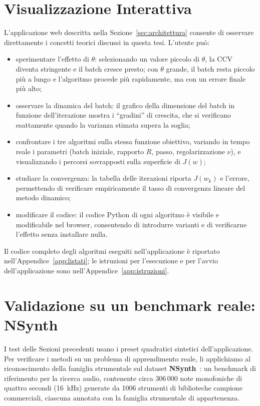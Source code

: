 \documentclass[italian, a4paper, twoside, binding=6mm]{sapthesis}
\begin{document}
\section{Visualizzazione Interattiva}\label{sec:visualizzazione}

L'applicazione web descritta nella Sezione~\ref{sec:architettura} consente
di osservare direttamente i concetti teorici discussi in questa tesi.
L'utente può:

\begin{itemize}
  \item sperimentare l'effetto di $\theta$: selezionando un valore
  piccolo di $\theta$, la CCV diventa stringente e il batch cresce presto; con
  $\theta$ grande, il batch resta piccolo più a lungo e l'algoritmo procede
  più rapidamente, ma con un errore finale più alto;
  \item osservare la dinamica del batch: il grafico della dimensione
  del batch in funzione dell'iterazione mostra i ``gradini'' di crescita,
  che si verificano esattamente quando la varianza stimata supera la soglia;
  \item confrontare i tre algoritmi sulla stessa funzione obiettivo,
  variando in tempo reale i parametri (batch iniziale, rapporto $R$, passo,
  regolarizzazione $\nu$), e visualizzando i percorsi sovrapposti sulla
  superficie di $J(w)$;
  \item studiare la convergenza: la tabella delle iterazioni riporta
  $J(w_k)$ e l'errore, permettendo di verificare empiricamente il tasso di
  convergenza lineare del metodo dinamico;
  \item modificare il codice: il codice Python di ogni algoritmo è
  visibile e modificabile nel browser, consentendo di introdurre varianti e di
  verificarne l'effetto senza installare nulla.
\end{itemize}

Il codice completo degli algoritmi eseguiti nell'applicazione è riportato
nell'Appendice~\ref{app:listati}; le istruzioni per l'esecuzione e per
l'avvio dell'applicazione sono nell'Appendice~\ref{app:istruzioni}.


\section{Validazione su un benchmark reale: NSynth}\label{sec:nsynth}

I test delle Sezioni precedenti usano i preset quadratici sintetici
dell'applicazione. Per verificare i metodi su un problema di apprendimento
reale, li applichiamo al riconoscimento della famiglia strumentale sul
dataset \textbf{NSynth}~\cite{engel2017}: un benchmark di riferimento per la
ricerca audio, contenente circa $306\,000$ note monofoniche di quattro
secondi (16~kHz) generate da 1006 strumenti di biblioteche campione
commerciali, ciascuna annotata con la famiglia strumentale di appartenenza.
\end{document}
